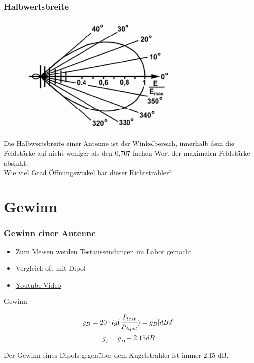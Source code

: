 \begin{frame}
  \frametitle{Halbwertsbreite}
  \begin{center}
    \begin{figure}
      \includegraphics[width=0.7\textwidth,height=.75\textheight,keepaspectratio]{a09/TH213.png}
    \end{figure}
    \large Die Halbwertsbreite einer Antenne ist der Winkelbereich, innerhalb dem
    die Feldstärke auf nicht weniger als den 0,707-fachen Wert der maximalen Feldstärke absinkt.\\[1em] Wie viel Grad Öffnungswinkel hat dieser Richtstrahler?
  \end{center}
\end{frame}

\section*{Gewinn}

\begin{frame}
  \frametitle{Gewinn einer Antenne}
  \begin{itemize}
    \item Zum Messen werden Testaussendungen im Labor gemacht
    \item Vergleich oft mit Dipol
    \item \href{https://www.youtube.com/watch?v=gBqqp7rnZ64}{\ExternalLink Youtube-Video}\\[2em]
  \end{itemize}
  \begin{block}{Gewinn}
    \begin{center}
      $$g_D = 20 \cdot lg(\cfrac{P_{test}}{P_{dipol}}) = g_D[dBd]$$
      $$g_I = g_D + 2.15dB$$
    \end{center}
    Der Gewinn eines Dipols gegenüber dem Kugelstrahler ist immer 2,15 dB.
  \end{block}
\end{frame}

